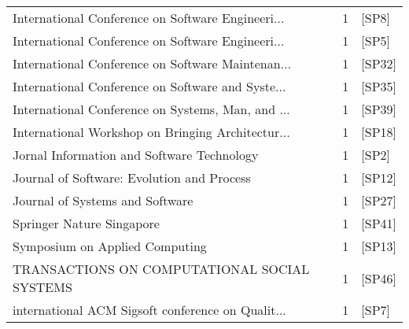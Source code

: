 \begin{tabular}{lrl}
 International Conference on Software Engineeri... &      1 &                                [SP8] \\
 International Conference on Software Engineeri... &      1 &                                [SP5] \\
 International Conference on Software Maintenan... &      1 &                               [SP32] \\
 International Conference on Software and Syste... &      1 &                               [SP35] \\
 International Conference on Systems, Man, and ... &      1 &                               [SP39] \\
 International Workshop on Bringing Architectur... &      1 &                               [SP18] \\
        Jornal Information and Software Technology &      1 &                                [SP2] \\
        Journal of Software: Evolution and Process &      1 &                               [SP12] \\
                   Journal of Systems and Software &      1 &                               [SP27] \\
                         Springer Nature Singapore &      1 &                               [SP41] \\
                    Symposium on Applied Computing &      1 &                               [SP13] \\
      TRANSACTIONS ON COMPUTATIONAL SOCIAL SYSTEMS &      1 &                               [SP46] \\
 international ACM Sigsoft conference on Qualit... &      1 &                                [SP7] \\
\bottomrule
\end{tabular}
